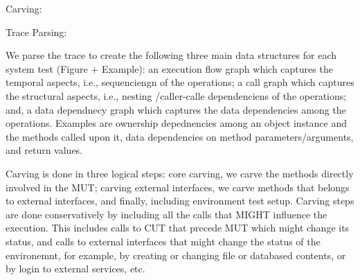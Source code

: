 \documentclass[10pt,conference]{IEEEtran}
\begin{document}
Carving:

Trace Parsing:

We parse the trace to create the following three main data structures for each system test (Figure + Example):
an execution flow graph which captures the temporal aspects, i.e., sequenciengn of the operations;
a call graph which captures the structural aspects, i.e., nesting /caller-calle dependenciens of the operations;
and, a data dependnecy graph which captures the data dependencies among the operations. Examples are ownership depednencies among an object instance and the methods called upon it, data dependencies on method parameters/arguments, and return values.

Carving is done in three logical steps: core carving, we carve the methods directly involved in the MUT; carving external interfaces, we carve methods that belongs to external interfaces, and finally,  including environment test setup. Carving steps are done conservatively by including all the calls that MIGHT influence the execution. This includes calls to CUT that precede MUT which might change its status, and calls to external interfaces that might change the status of the environemnt, for example, by creating or changing file or databased contents, or by login to external services, etc. 
\end{document}
